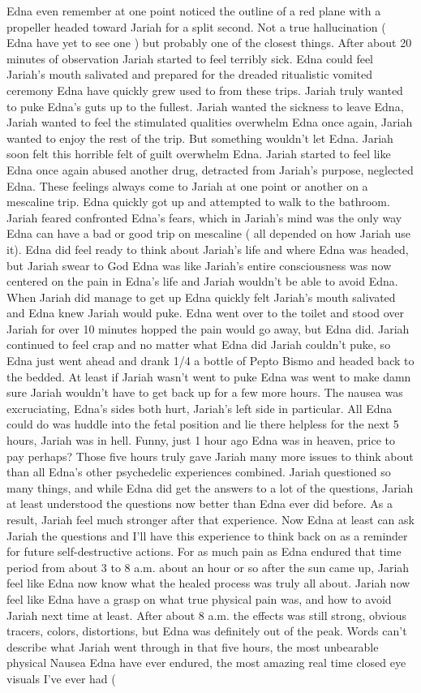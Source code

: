 \documentclass[12pt]{book}
\begin{document}
Edna even remember at one point noticed the outline of a red plane with a propeller headed toward Jariah for a split second. Not a true hallucination ( Edna have yet to see one ) but probably one of the closest things. After about 20 minutes of observation Jariah started to feel terribly sick. Edna could feel Jariah's mouth salivated and prepared for the dreaded ritualistic vomited ceremony Edna have quickly grew used to from these trips. Jariah truly wanted to puke Edna's guts up to the fullest. Jariah wanted the sickness to leave Edna, Jariah wanted to feel the stimulated qualities overwhelm Edna once again, Jariah wanted to enjoy the rest of the trip. But something wouldn't let Edna. Jariah soon felt this horrible felt of guilt overwhelm Edna. Jariah started to feel like Edna once again abused another drug, detracted from Jariah's purpose, neglected Edna. These feelings always come to Jariah at one point or another on a mescaline trip. Edna quickly got up and attempted to walk to the bathroom. Jariah feared confronted Edna's fears, which in Jariah's mind was the only way Edna can have a bad or good trip on mescaline ( all depended on how Jariah use it). Edna did feel ready to think about Jariah's life and where Edna was headed, but Jariah swear to God Edna was like Jariah's entire consciousness was now centered on the pain in Edna's life and Jariah wouldn't be able to avoid Edna. When Jariah did manage to get up Edna quickly felt Jariah's mouth salivated and Edna knew Jariah would puke. Edna went over to the toilet and stood over Jariah for over 10 minutes hopped the pain would go away, but Edna did. Jariah continued to feel crap and no matter what Edna did Jariah couldn't puke, so Edna just went ahead and drank 1/4 a bottle of Pepto Bismo and headed back to the bedded. At least if Jariah wasn't went to puke Edna was went to make damn sure Jariah wouldn't have to get back up for a few more hours. The nausea was excruciating, Edna's sides both hurt, Jariah's left side in particular. All Edna could do was huddle into the fetal position and lie there helpless for the next 5 hours, Jariah was in hell. Funny, just 1 hour ago Edna was in heaven, price to pay perhaps? Those five hours truly gave Jariah many more issues to think about than all Edna's other psychedelic experiences combined. Jariah questioned so many things, and while Edna did get the answers to a lot of the questions, Jariah at least understood the questions now better than Edna ever did before. As a result, Jariah feel much stronger after that experience. Now Edna at least can ask Jariah the questions and I'll have this experience to think back on as a reminder for future self-destructive actions. For as much pain as Edna endured that time period from about 3 to 8 a.m. about an hour or so after the sun came up, Jariah feel like Edna now know what the healed process was truly all about. Jariah now feel like Edna have a grasp on what true physical pain was, and how to avoid Jariah next time at least. After about 8 a.m. the effects was still strong, obvious tracers, colors, distortions, but Edna was definitely out of the peak. Words can't describe what Jariah went through in that five hours, the most unbearable physical Nausea Edna have ever endured, the most amazing real time closed eye visuals I've ever had ( 
\end{document}
